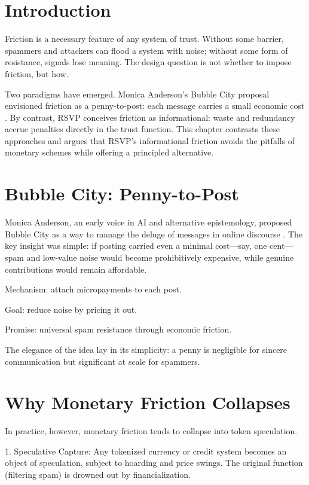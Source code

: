 \documentclass{book}
\begin{document}
\section{Introduction}

Friction is a necessary feature of any system of trust. Without some barrier, spammers and attackers can flood a system with noise; without some form of resistance, signals lose meaning. The design question is not whether to impose friction, but how.

Two paradigms have emerged. Monica Anderson’s Bubble City proposal envisioned friction as a penny-to-post: each message carries a small economic cost \cite{anderson2022}. By contrast, RSVP conceives friction as informational: waste and redundancy accrue penalties directly in the trust function. This chapter contrasts these approaches and argues that RSVP’s informational friction avoids the pitfalls of monetary schemes while offering a principled alternative.

\section{Bubble City: Penny-to-Post}

Monica Anderson, an early voice in AI and alternative epistemology, proposed Bubble City as a way to manage the deluge of messages in online discourse \cite{anderson2022}. The key insight was simple: if posting carried even a minimal cost—say, one cent—spam and low-value noise would become prohibitively expensive, while genuine contributions would remain affordable.

Mechanism: attach micropayments to each post.

Goal: reduce noise by pricing it out.

Promise: universal spam resistance through economic friction.

The elegance of the idea lay in its simplicity: a penny is negligible for sincere communication but significant at scale for spammers.

\section{Why Monetary Friction Collapses}

In practice, however, monetary friction tends to collapse into token speculation.

1. Speculative Capture: Any tokenized currency or credit system becomes an object of speculation, subject to hoarding and price swings. The original function (filtering spam) is drowned out by financialization.
\end{document}
